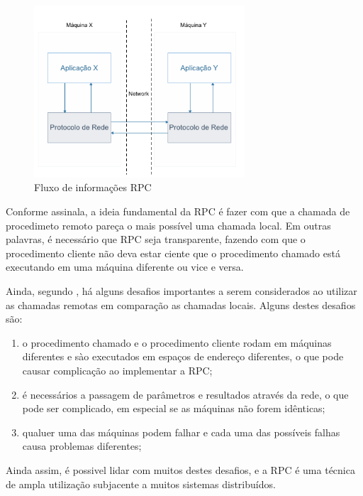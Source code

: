 \begin{figure}
    \centering
    \includegraphics[width=0.7\textwidth]{figuras/rpc.png}
    \caption{Fluxo de informações RPC}
    \label{fig:rpc}
\end{figure}

Conforme  assinala, a ideia fundamental da RPC é fazer com que a chamada de procedimeto remoto pareça o mais possível uma chamada local. Em outras palavras, é necessário que RPC seja transparente, fazendo com que o procedimento cliente não deva estar ciente que o procedimento chamado está executando em uma máquina diferente ou vice e versa.

Ainda, segundo \cite{van2007sistemas}, há alguns desafios importantes a serem considerados ao utilizar as chamadas remotas em comparação as chamadas locais. Alguns destes desafios são:

\begin{enumerate}[label=\alph*)]
    \item o procedimento chamado e o procedimento cliente rodam em máquinas diferentes e sào executados em espaços de endereço diferentes, o que pode causar complicação ao implementar a RPC; 

\item é necessários a passagem de parâmetros e resultados através da rede, o que pode ser complicado, em especial se as máquinas não forem idênticas;

\item qualuer uma das máquinas podem falhar e cada uma das possíveis falhas causa problemas diferentes;

\end{enumerate}

Ainda assim, é possivel lidar com muitos destes desafios, e a RPC é uma técnica de ampla utilização subjacente a muitos sistemas distribuídos.

